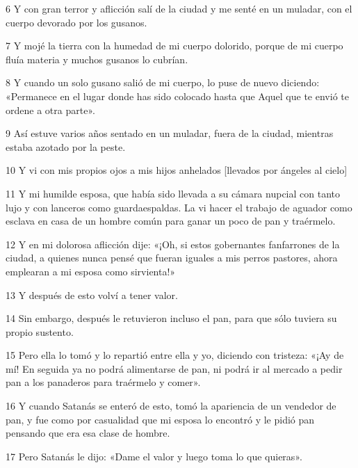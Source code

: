 \par 6 Y con gran terror y aflicción salí de la ciudad y me senté en un muladar, con el cuerpo devorado por los gusanos.

\par 7 Y mojé la tierra con la humedad de mi cuerpo dolorido, porque de mi cuerpo fluía materia y muchos gusanos lo cubrían.

\par 8 Y cuando un solo gusano salió de mi cuerpo, lo puse de nuevo diciendo: «Permanece en el lugar donde has sido colocado hasta que Aquel que te envió te ordene a otra parte».

\par 9 Así estuve varios años sentado en un muladar, fuera de la ciudad, mientras estaba azotado por la peste.

\par 10 Y vi con mis propios ojos a mis hijos anhelados [llevados por ángeles al cielo]

\par 11 Y mi humilde esposa, que había sido llevada a su cámara nupcial con tanto lujo y con lanceros como guardaespaldas. La vi hacer el trabajo de aguador como esclava en casa de un hombre común para ganar un poco de pan y traérmelo.

\par 12 Y en mi dolorosa aflicción dije: «¡Oh, si estos gobernantes fanfarrones de la ciudad, a quienes nunca pensé que fueran iguales a mis perros pastores, ahora emplearan a mi esposa como sirvienta!»

\par 13 Y después de esto volví a tener valor.

\par 14 Sin embargo, después le retuvieron incluso el pan, para que sólo tuviera su propio sustento.

\par 15 Pero ella lo tomó y lo repartió entre ella y yo, diciendo con tristeza: «¡Ay de mí! En seguida ya no podrá alimentarse de pan, ni podrá ir al mercado a pedir pan a los panaderos para traérmelo y comer».

\par 16 Y cuando Satanás se enteró de esto, tomó la apariencia de un vendedor de pan, y fue como por casualidad que mi esposa lo encontró y le pidió pan pensando que era esa clase de hombre.

\par 17 Pero Satanás le dijo: «Dame el valor y luego toma lo que quieras».

